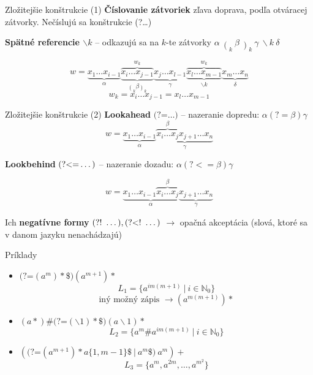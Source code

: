 \documentclass[mathserif]{beamer}
\def\N{\mathds{N}} %
\def\lookahead{\text{(?=}}
\def\nlookahead{\text{(?!~}}
\def\lookbehind{\text{(?\textless =}}
\def\nlookbehind{\text{(?\textless !~}}
\begin{document}
\begin{frame}{Zložitejšie konštrukcie (1)}
\textbf{Číslovanie zátvoriek} zľava doprava, podľa otváracej zátvorky. Nečíslujú sa konštrukcie (?\dots)

\vspace{20pt}
\textbf{Spätné referencie $\backslash k$} -- odkazujú sa na $k$-te zátvorky
$\displaystyle \alpha~ \mathop(_k ~\beta ~\mathop)_k ~\gamma ~\backslash k ~\delta$

$$w = \underbrace{x_1\dots x_{i-1}}_\alpha 
 \overbrace{\underbrace{x_i\dots x_{j-1}}_{ \displaystyle{\mathop(_k\beta \mathop)_k}}}^{w_k} 
 \underbrace{x_j\dots x_{l-1}}_\gamma 
 \overbrace{\underbrace{x_l\dots x_{m-1}}_{\backslash k}}^{w_k}
 \underbrace{x_{m}\dots x_{n}}_\delta$$
\vspace{10pt} 
$$ w_k = x_i\dots x_{j-1} = x_l\dots x_{m-1} $$

\end{frame}
\begin{frame}{Zložitejšie konštrukcie (2)}
\textbf{Lookahead} $\lookahead\dots)$ -- nazeranie dopredu:
$\alpha(?=\beta)\gamma$ $$w = \underbrace{x_1\dots x_{i-1}}_\alpha \underbrace{\overbrace{x_i \dots x_j}^\beta x_{j+1} \dots x_n }_\gamma$$ 

\textbf{Lookbehind} $\lookbehind\dots)$ -- nazeranie dozadu: $\alpha(?<=\beta)\gamma$

$$w = \underbrace{x_1\dots x_{i-1} \overbrace{x_i \dots x_j}^\beta}_\alpha \underbrace{x_{j+1} \dots x_n }_\gamma$$

Ich \textbf{negatívne formy} $\nlookahead\dots),\nlookbehind\dots)$ $\rightarrow$ opačná akceptácia (slová, ktoré sa v danom jazyku nenachádzajú)
\end{frame}

\begin{frame}{Príklady}
\begin{itemize}
\item ${\lookahead (a^m)*\$)(a^{m+1})*}$
$$L_1 = \lbrace a^{im(m+1)}~|~i\in\N_0\rbrace$$
$$\text{iný možný zápis } \rightarrow (a^{m(m+1)})*$$
\item $(a*)\#\lookahead(\backslash 1)*\$)(a\backslash 1)*$
$$L_2 = \lbrace a^m\# a^{im(m+1)} ~|~ i\in\N_0\rbrace$$
\vspace{10pt}
\item ${ \left(\lookahead (a^{m+1})* a\lbrace 1,m-1\rbrace \$ ~|~ a^m \$)~ a^m\right)+ }$
$$L_3 = \lbrace a^m,a^{2m}, \dots, a^{m^2} \rbrace$$
\end{itemize}
\end{frame}
\end{document}
